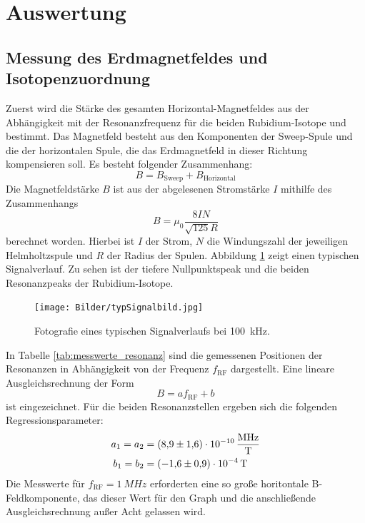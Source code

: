 \section{Auswertung}
\subsection{Messung des Erdmagnetfeldes und Isotopenzuordnung}
Zuerst wird die Stärke des gesamten Horizontal-Magnetfeldes aus der Abhängigkeit mit der Resonanzfrequenz für die beiden Rubidium-Isotope  und  bestimmt.
Das Magnetfeld besteht aus den Komponenten der Sweep-Spule und die der horizontalen Spule, die das Erdmagnetfeld in dieser Richtung kompensieren soll. Es besteht folgender Zusammenhang:
\begin{equation}
  B=B_\text{Sweep}+B_\text{Horizontal}
\end{equation}
Die Magnetfeldstärke $B$ ist aus der abgelesenen Stromstärke $I$ mithilfe des Zusammenhangs
\begin{equation}
B=\mu_0\frac{8IN}{\sqrt{125}R}
\end{equation}
berechnet worden. Hierbei ist $I$ der Strom, $N$ die Windungszahl der jeweiligen Helmholtzspule und $R$ der Radius der Spulen.
Abbildung \ref{fig:typSignalbild} zeigt einen typischen Signalverlauf. Zu sehen ist der tiefere Nullpunktspeak und die beiden Resonanzpeaks der Rubidium-Isotope.
\begin{figure}[H]
  \centering
  \texttt{[image: Bilder/typSignalbild.jpg]}
  \caption{Fotografie eines typischen Signalverlaufs bei \SI{100}{kHz}.}
  \label{fig:typSignalbild}
\end{figure}
In Tabelle \ref{tab:messwerte_resonanz} sind die gemessenen Positionen der Resonanzen in Abhängigkeit von der Frequenz $f_\text{RF}$ dargestellt. Eine lineare Ausgleichsrechnung der Form
\begin{equation}
  B=af_\text{RF}+b
\end{equation}
ist eingezeichnet.
Für die beiden Resonanzstellen ergeben sich die folgenden Regressionsparameter:
\begin{align*}
  a_1 = a_2 &= \SI{8,9 \pm 1,6 e-10}{\frac{MHz}{T}} \\
  b_1 = b_2 &= \SI{-1,6 \pm 0,9 e-4}{T}\\
\end{align*}
Die Messwerte für $f_\text{RF}=\SI{1}{MHz}$ erforderten eine so große horitontale B-Feldkomponente, das dieser Wert für den Graph und die anschließende Ausgleichsrechnung außer Acht gelassen wird.
